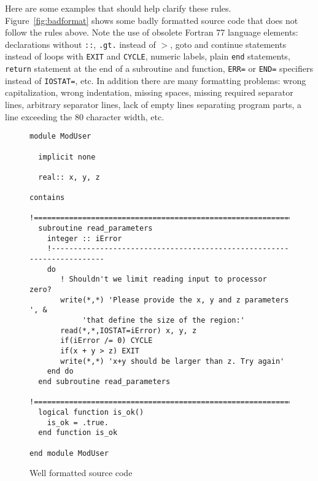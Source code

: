 \documentclass{article}
\begin{document}
Here are some examples that should help clarify these rules. 
Figure~\ref{fig:badformat} shows some badly formatted source 
code that does not follow the rules above.
Note the use of obsolete Fortran 77 language elements:
declarations without {\tt ::}, {\tt .gt.} instead of $>$, 
{goto} and {continue} statements instead of loops with 
{\tt EXIT} and {\tt CYCLE}, 
numeric labels, plain {\tt end} statements, 
{\tt return} statement at the end of a subroutine and
function, {\tt ERR=} or {\tt END=} specifiers instead of {\tt IOSTAT=}, etc.
In addition there are many formatting problems:
wrong capitalization, wrong indentation, missing spaces, missing
required separator lines, arbitrary separator lines,
lack of empty lines separating program parts, a line
exceeding the 80 character width, etc.

\begin{figure}
\begin{verbatim}
module ModUser

  implicit none

  real:: x, y, z

contains
  !=========================================================================
  subroutine read_parameters 
    integer :: iError
    !-----------------------------------------------------------------------
    do
       ! Shouldn't we limit reading input to processor zero?
       write(*,*) 'Please provide the x, y and z parameters ', &
            'that define the size of the region:'
       read(*,*,IOSTAT=iError) x, y, z
       if(iError /= 0) CYCLE
       if(x + y > z) EXIT
       write(*,*) 'x+y should be larger than z. Try again'
    end do
  end subroutine read_parameters
  !=========================================================================
  logical function is_ok()
    is_ok = .true.
  end function is_ok

end module ModUser
\end{verbatim}
\caption{Well formatted source code}
\label{fig:goodformat}
\end{figure}
\end{document}
